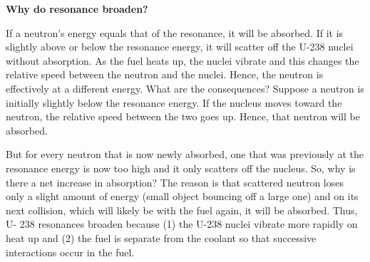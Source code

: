 \documentclass{school-22.211-notes}
\begin{document}
\textbf{Why do resonance broaden?} 

If a neutron's energy equals that of the resonance, it will be absorbed. If it is
slightly above or below the resonance energy, it will scatter off the U-238 nuclei
without absorption. As the fuel heats up, the nuclei vibrate and this changes the
relative speed between the neutron and the nuclei. Hence, the neutron is
effectively at a different energy. What are the consequences? Suppose a neutron
is initially slightly below the resonance energy. If the nucleus moves toward the
neutron, the relative speed between the two goes up. Hence, that neutron will be
absorbed.

But for every neutron that is now newly absorbed, one that was previously at the
resonance energy is now too high and it only scatters off the nucleus. So, why is
there a net increase in absorption? The reason is that scattered neutron loses only
a slight amount of energy (small object bouncing off a large one) and on its next
collision, which will likely be with the fuel again, it will be absorbed. Thus, U-
238 resonances broaden because (1) the U-238 nuclei vibrate more rapidly on heat
up and (2) the fuel is separate from the coolant so that successive interactions
occur in the fuel.
\end{document}
